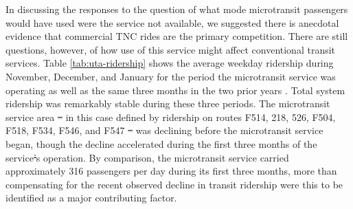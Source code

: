 \documentclass[smartcities,article,submit,moreauthors,pdftex]{mdpi} %
\providecommand{\DIFadd}[1]{{\protect\color{blue}\uwave{#1}}} %
\providecommand{\DIFdel}[1]{{\protect\color{red}\sout{#1}}}                      %
\providecommand{\DIFaddbegin}{} %
\providecommand{\DIFaddend}{} %
\providecommand{\DIFdelbegin}{} %
\providecommand{\DIFdelend}{} %
\begin{document}
In discussing the responses to the question of what mode microtransit passengers
would have used were the service not available, we suggested there is anecdotal
evidence that commercial TNC rides are the primary competition. There are still
questions, however, of how use of this service might affect conventional transit
services. Table \ref{tab:uta-ridership} shows the average weekday ridership
during November, December, and January for the period the microtransit service
was operating as well as the same three months in the two prior years
\citet{uta2020boardings}. Total system ridership was remarkably stable during
these three periods. The microtransit service area \DIFdelbegin \DIFdel{– }\DIFdelend \DIFaddbegin \DIFadd{-- }\DIFaddend in this case defined by
ridership on routes F514, 218, 526, F504, F518, F534, F546, and F547 \DIFdelbegin \DIFdel{– }\DIFdelend \DIFaddbegin \DIFadd{-- }\DIFaddend was
declining before the microtransit service began, though the decline accelerated
during the first three months of the service\DIFdelbegin \DIFdel{’}\DIFdelend \DIFaddbegin \DIFadd{'}\DIFaddend s operation. By comparison, the
microtransit service carried approximately 316 passengers per day during its
first three months, more than compensating for the recent observed decline in
transit ridership were this to be identified as a major contributing factor.
\end{document}
